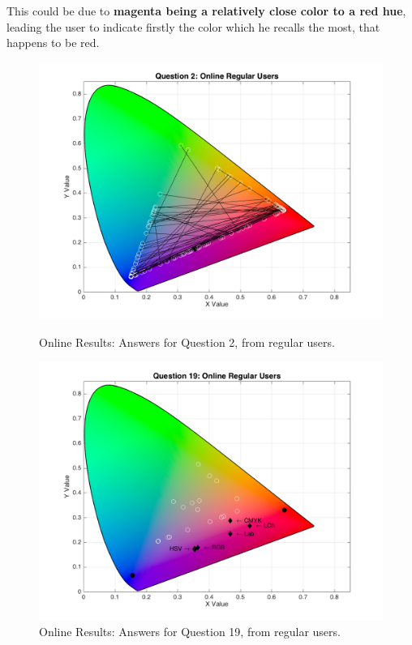 This could be due to \textbf{magenta being a relatively close color to a red hue}, leading the user to indicate firstly the color which he recalls the most, that happens to be red.
%
\begin{figure}[!htbp]
  \centering
  \begin{minipage}{0.48\textwidth}
    \centering
    \includegraphics[width=\textwidth]{images/results/2_online_regularUsers.png}
    \caption[Online Results: Answers for Question 2, from regular users.]{Online Results: Answers for Question 2, from regular users.}
    \label{fig:magentablend_1}
  \end{minipage}\hfill
  \begin{minipage}{0.48\textwidth}
    \centering
    \includegraphics[width=\textwidth]{images/results/19_online_regularUsers.png}
    \caption[Online Results: Answers for Question 19, from regular users.]{Online Results: Answers for Question 19, from regular users.}
    \label{fig:magentablend_2}
  \end{minipage}
\end{figure}
%
